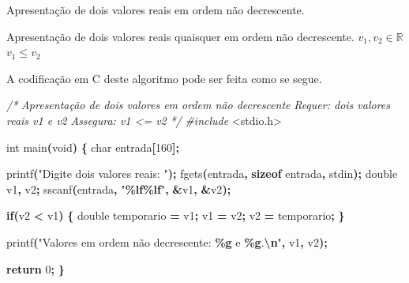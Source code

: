 \documentclass[
  11pt,
  a4paper,
]{scrbook}
\newenvironment{Shaded}{\begin{snugshade}}{\end{snugshade}}
\newcommand{\CommentTok}[1]{\textcolor[rgb]{0.56,0.35,0.01}{\textit{#1}}}
\newcommand{\ControlFlowTok}[1]{\textcolor[rgb]{0.13,0.29,0.53}{\textbf{#1}}}
\newcommand{\DataTypeTok}[1]{\textcolor[rgb]{0.13,0.29,0.53}{#1}}
\newcommand{\DecValTok}[1]{\textcolor[rgb]{0.00,0.00,0.81}{#1}}
\newcommand{\ImportTok}[1]{#1}
\newcommand{\KeywordTok}[1]{\textcolor[rgb]{0.13,0.29,0.53}{\textbf{#1}}}
\newcommand{\NormalTok}[1]{#1}
\newcommand{\OperatorTok}[1]{\textcolor[rgb]{0.81,0.36,0.00}{\textbf{#1}}}
\newcommand{\PreprocessorTok}[1]{\textcolor[rgb]{0.56,0.35,0.01}{\textit{#1}}}
\newcommand{\SpecialCharTok}[1]{\textcolor[rgb]{0.81,0.36,0.00}{\textbf{#1}}}
\newcommand{\StringTok}[1]{\textcolor[rgb]{0.31,0.60,0.02}{#1}}
\begin{document}
\begin{algorithm}
\caption{\label{alg-escrita-nao-decrescente}Apresentação de dois valores
reais em ordem não decrescente.}
\begingroup%


\begin{algorithmic}
    \Description Apresentação de dois valores reais quaisquer em ordem não decrescente.
    \Require $v_1, v_2 \in \mathbb{R}$
    \Ensure $v_1 \leq v_2$
    \Statex{}
    \EndIf
\end{algorithmic}

\endgroup
\end{algorithm}

A codificação em C deste algoritmo pode ser feita como se segue.

\begin{Shaded}
\begin{Highlighting}[]
\CommentTok{/*}
\CommentTok{Apresentação de dois valores em ordem não decrescente}
\CommentTok{Requer: dois valores reais v1 e v2}
\CommentTok{Assegura: v1 \textless{}= v2}
\CommentTok{*/}
\PreprocessorTok{\#include }\ImportTok{\textless{}stdio.h\textgreater{}}

\DataTypeTok{int}\NormalTok{ main}\OperatorTok{(}\DataTypeTok{void}\OperatorTok{)} \OperatorTok{\{}
    \DataTypeTok{char}\NormalTok{ entrada}\OperatorTok{[}\DecValTok{160}\OperatorTok{];}

\NormalTok{    printf}\OperatorTok{(}\StringTok{"Digite dois valores reais: "}\OperatorTok{);}
\NormalTok{    fgets}\OperatorTok{(}\NormalTok{entrada}\OperatorTok{,} \KeywordTok{sizeof}\NormalTok{ entrada}\OperatorTok{,}\NormalTok{ stdin}\OperatorTok{);}
    \DataTypeTok{double}\NormalTok{ v1}\OperatorTok{,}\NormalTok{ v2}\OperatorTok{;}
\NormalTok{    sscanf}\OperatorTok{(}\NormalTok{entrada}\OperatorTok{,} \StringTok{"}\SpecialCharTok{\%lf\%lf}\StringTok{"}\OperatorTok{,} \OperatorTok{\&}\NormalTok{v1}\OperatorTok{,} \OperatorTok{\&}\NormalTok{v2}\OperatorTok{);}

    \ControlFlowTok{if}\OperatorTok{(}\NormalTok{v2 }\OperatorTok{\textless{}}\NormalTok{ v1}\OperatorTok{)} \OperatorTok{\{}
        \DataTypeTok{double}\NormalTok{ temporario }\OperatorTok{=}\NormalTok{ v1}\OperatorTok{;}
\NormalTok{        v1 }\OperatorTok{=}\NormalTok{ v2}\OperatorTok{;}
\NormalTok{        v2 }\OperatorTok{=}\NormalTok{ temporario}\OperatorTok{;}
    \OperatorTok{\}}

\NormalTok{    printf}\OperatorTok{(}\StringTok{"Valores em ordem não decrescente: }\SpecialCharTok{\%g}\StringTok{ e }\SpecialCharTok{\%g}\StringTok{.}\SpecialCharTok{\textbackslash{}n}\StringTok{"}\OperatorTok{,}\NormalTok{ v1}\OperatorTok{,}\NormalTok{ v2}\OperatorTok{);}
    
    \ControlFlowTok{return} \DecValTok{0}\OperatorTok{;}
\OperatorTok{\}}
\end{Highlighting}
\end{Shaded}
\end{document}
